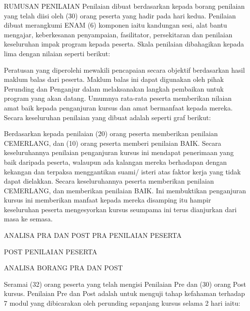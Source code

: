 RUMUSAN PENILAIAN
Penilaian dibuat berdasarkan kepada borang penilaian yang telah diisi oleh (30) orang peserta yang hadir pada hari kedua. Penilaian dibuat merangkumi ENAM (6) komponen iaitu kandungan sesi, alat bantu mengajar, keberkesanan penyampaian, fasilitator, persekitaran dan penilaian keseluruhan impak program kepada peserta. Skala penilaian dibahagikan kepada lima dengan nilaian seperti berikut:

Peratusan yang diperolehi mewakili pencapaian secara objektif berdasarkan hasil maklum balas dari peserta. Maklum balas ini dapat digunakan oleh pihak Perunding dan Penganjur dalam melaksanakan langkah pembaikan untuk program yang akan datang. Umumnya rata-rata peserta memberikan nilaian amat baik kepada penganjuran kursus dan amat bermanfaat kepada mereka. Secara keseluruhan penilaian yang dibuat adalah seperti graf berikut:



























Berdasarkan kepada penilaian (20) orang peserta memberikan penilaian CEMERLANG, dan (10) orang peserta memberi penilaian BAIK. Secara keseluruhannya penilaian penganjuran kursus ini mendapat penerimaan yang baik daripada peserta, walaupun ada kalangan mereka berhadapan dengan kekangan dan terpaksa menggantikan suami/ isteri atas faktor kerja yang tidak dapat dielakkan. Secara keseluruhannya peserta memberikan penilaian CEMERLANG, dan memberikan penilaian BAIK. Ini membuktikan penganjuran kursus ini memberikan manfaat kepada mereka disamping itu hampir keseluruhan peserta mengesyorkan kursus seumpama ini terus dianjurkan dari masa ke semasa.


ANALISA PRA DAN POST
PRA PENILAIAN PESERTA


POST PENILAIAN PESERTA


ANALISA BORANG PRA DAN POST

Seramai (32) orang peserta yang telah mengisi Penilaian Pre dan (30) orang Post kursus. Penilaian Pre dan Post adalah untuk menguji tahap kefahaman terhadap 7 modul yang dibicarakan oleh perunding sepanjang kursus selama 2 hari iaitu:

